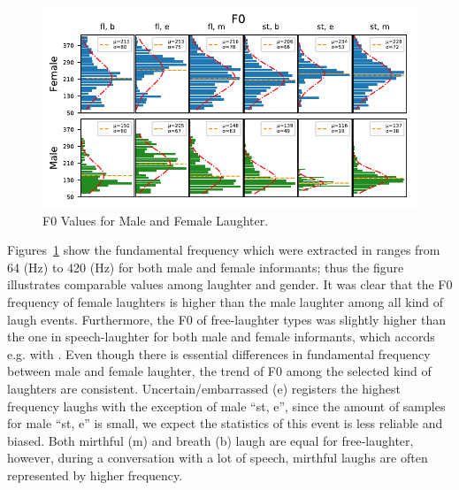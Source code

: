 \documentclass[10pt,journal,compsoc]{IEEEtran}
\begin{document}
\begin{figure}[!t]
\centering
\includegraphics[width=1\linewidth]{figures/f0.pdf}
\caption{F0 Values for Male and Female Laughter.}
\label{fig:f0}
\end{figure}
Figures~\ref{fig:f0} show the fundamental frequency which were extracted in ranges from 64 (Hz) to 420 (Hz) for both male and female informants; thus the figure illustrates comparable values among laughter and gender.
It was clear that the F0 frequency of female laughters is higher than the male laughter among all kind of laugh events. Furthermore, the F0 of free-laughter types was slightly higher than the one in speech-laughter for both male and female informants, which accords e.g. with \cite{Truong:vanLeeuwen:07}.
Even though there is essential differences in fundamental frequency between male and female laughter, the trend of F0 among the selected kind of laughters are consistent. Uncertain/embarrassed (e) registers the highest frequency laughs with the exception of male ``st, e'', since the amount of samples for male ``st, e'' is small, we expect the statistics of this event is less reliable and biased.
Both mirthful (m) and breath (b) laugh are equal for free-laughter, however, during a conversation with a lot of speech, mirthful laughs are often represented by higher frequency.
\end{document}
